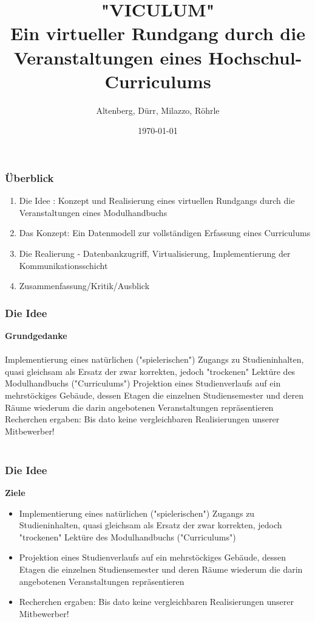 \documentclass{beamer}
\title[Viculum]{"VICULUM" \\ Ein virtueller Rundgang durch die Veranstaltungen eines Hochschul-Curriculums } %
\author{Altenberg, Dürr, Milazzo, Röhrle}
\institute[]
{
Hochschule Albstadt-Sigmaringen \\ %
\medskip
\textit{Fabian Altenberg (WIN), altenbfa@hs-albsig.de} %
\newline
\textit{Maik Dürr (TI), duerrmai@hs-albsig.de} %
\newline
\textit{Domenico Milazzo (TI), milazzdo@hs-albsig.de} %
\newline
\textit{Prof. Dr. Jörg Röhrle, roehrle@hs-albsig.de} %
\newline
}
\date{\today} %
\begin{document}
\begin{frame}
\titlepage %
\end{frame}

\begin{frame}
\frametitle{Überblick}
\begin{enumerate}
\item Die Idee : Konzept und Realisierung eines virtuellen Rundgangs durch die Veranstaltungen eines Modulhandbuchs 
\item Das Konzept: Ein Datenmodell zur vollständigen Erfassung eines Curriculums 
\item Die Realierung - Datenbankzugriff, Virtualisierung, Implementierung der Kommunikationsschicht
\item Zusammenfassung/Kritik/Ausblick
\end{enumerate}
\end{frame}



\begin{frame}
\frametitle{Die Idee}
\textbf{Grundgedanke}\\~\\
Implementierung eines natürlichen ("spielerischen") Zugangs zu Studieninhalten, quasi gleichsam als Ersatz der zwar korrekten, jedoch "trockenen" Lektüre des Modulhandbuchs ("Curriculums")
Projektion eines Studienverlaufs auf ein mehrstöckiges Gebäude, dessen Etagen die einzelnen Studiensemester und deren Räume wiederum die darin angebotenen Veranstaltungen repräsentieren 
Recherchen ergaben: Bis dato keine vergleichbaren Realisierungen unserer Mitbewerber!\\~\\
\end{frame}



\begin{frame}
\frametitle{Die Idee}
\textbf{Ziele}
\begin{itemize}
\item Implementierung eines natürlichen ("spielerischen") Zugangs zu Studieninhalten, quasi gleichsam als Ersatz der zwar korrekten, jedoch "trockenen" Lektüre des Modulhandbuchs ("Curriculums")
\item Projektion eines Studienverlaufs auf ein mehrstöckiges Gebäude, dessen Etagen die einzelnen Studiensemester und deren Räume wiederum die darin angebotenen Veranstaltungen repräsentieren 
\item Recherchen ergaben:  Bis dato keine vergleichbaren Realisierungen unserer Mitbewerber!
\end{itemize}
\end{frame}
\end{document}
